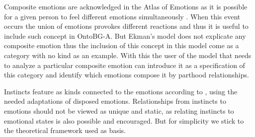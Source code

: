 Composite emotions are acknowledged in the Atlas of Emotions as it is possible for a given person to feel different emotions simultaneously \citep{ekman_are_basic_emotions_nodate}. When this event occurs the union of emotions provokes different reactions and thus it is useful to include such concept in OntoBG-A. But Ekman's model does not explicate any composite emotion thus the inclusion of this concept in this model come as a category with no kind as an example. With this the user of the model that needs to analyze a particular composite emotion can introduce it as a specification of this category and identify which emotions compose it by parthood relationships.

Instincts feature as kinds connected to the emotions according to \citeauthor{dillon_way_2010}, using the needed adaptations of disposed emotions. Relationships from instincts to emotions should not be viewed as unique and static, as relating instincts to emotional states is also possible and encouraged. But for simplicity we stick to the theoretical framework used as basis.